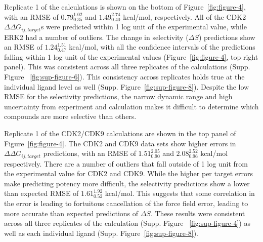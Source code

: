 \documentclass[phd,tocprelim]{cornell}
\begin{document}
Replicate 1 of the calculations is shown on the bottom of Figure~\ref{fig:figure-4}, with an RMSE of $0.79^{1.02}_{0.35}$ and $1.49^{2.74}_{0.40}$ kcal/mol, respectively. All of the CDK2 $\Delta \Delta G_{ij, target}$s were predicted within 1 log unit of the experimental value, while ERK2 had a number of outliers. The change in selectivity ($\Delta S$) predictions show an RMSE of $1.24^{1.51}_{0.47}$ kcal/mol, with all the confidence intervals of the predictions falling within 1 log unit of the experimental values (Figure~\ref{fig:figure-4}, top right panel). This was consistent across all three replicates of the calculations (Supp. Figure ~\ref{fig:sup-figure-6}). This consistency across replicates holds true at the individual ligand level as well (Supp. Figure~\ref{fig:sup-figure-8}). Despite the low RMSE for the selectivity predictions, the narrow dynamic range and high uncertainty from experiment and calculation makes it difficult to determine which compounds are more selective than others. 

Replicate 1 of the CDK2/CDK9 calculations are shown in the top panel of Figure~\ref{fig:figure-4}. The CDK2 and CDK9 data sets show higher errors in $\Delta \Delta G_{ij, target}$ predictions, with an RMSE of $1.51^{2.05}_{0.90}$ and $2.08^{2.52}_{0.96}$ kcal/mol respectively. There are a number of outliers that fall outside of 1 log unit from the experimental value for CDK2 and CDK9. While the higher per target errors make predicting potency more difficult, the selectivity predictions show a lower than expected RMSE of $1.61^{1.92}_{0.52}$ kcal/mol. This suggests that some correlation in the error is leading to fortuitous cancellation of the force field error, leading to more accurate than expected predictions of $\Delta S$. These results were consistent across all three replicates of the calculation (Supp. Figure ~\ref{fig:sup-figure-4}) as well as each individual ligand (Supp. Figure~\ref{fig:sup-figure-8}). 
\end{document}
